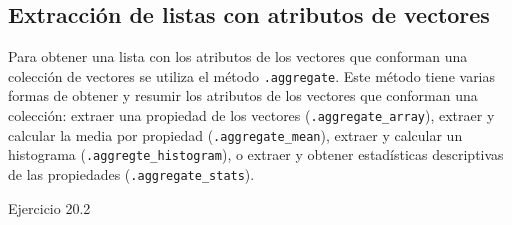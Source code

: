 \documentclass[
  12pt,
  letterpaper,
  twoside]{book}
\begin{document}
\hypertarget{extracciuxf3n-de-listas-con-atributos-de-vectores}{%
\subsection{Extracción de listas con atributos de vectores}\label{extracciuxf3n-de-listas-con-atributos-de-vectores}}

Para obtener una lista con los atributos de los vectores que conforman una colección de vectores se utiliza el método \texttt{.aggregate}. Este método tiene varias formas de obtener y resumir los atributos de los vectores que conforman una colección: extraer una propiedad de los vectores (\texttt{.aggregate\_array}), extraer y calcular la media por propiedad (\texttt{.aggregate\_mean}), extraer y calcular un histograma (\texttt{.aggregte\_histogram}), o extraer y obtener estadísticas descriptivas de las propiedades (\texttt{.aggregate\_stats}).

Ejercicio 20.2
\end{document}
